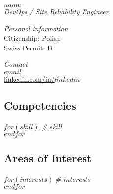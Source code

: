 \documentclass[$fontsize$, a4paper]{article}
\begin{document}

  {\LARGE $name$}\\[.2cm]
  {\large \textsl{DevOps / Site Reliability Engineer}}\\[.1cm]

\begin{multicols}{2}



\vspace{15pt}
\emph{Personal information}\\
Citizenship: Polish\\
Swiss Permit: B

\columnbreak

\vspace{15pt}
\emph{Contact}\\
\href{mailto:$email$}{$email$}\\
\href{http://linkedin.com/in/$linkedin$}{linkedin.com/in/$linkedin$}

\end{multicols}






\begin{multicols}{2}

\subsection*{Competencies}
$for(skill)$
\emph{\#} \enspace $skill$\\
$endfor$

\columnbreak

\subsection*{Areas of Interest}
$for(interests)$
\emph{\#} \enspace $interests$\\
$endfor$

\end{multicols}


\end{document}
